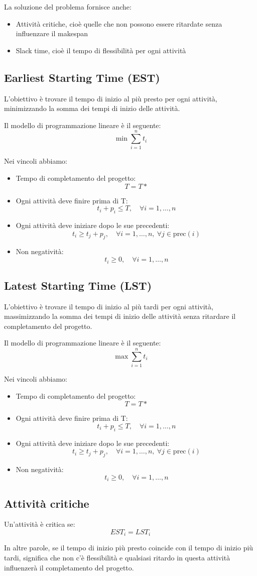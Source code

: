 La soluzione del problema fornisce anche:
\begin{itemize}
    \item Attività critiche, cioè quelle che non possono essere ritardate senza influenzare il makespan
    \item Slack time, cioè il tempo di flessibilità per ogni attività
\end{itemize}

\subsection{Earliest Starting Time (EST)}

L'obiettivo è trovare il tempo di inizio al più presto per ogni attività, 
minimizzando la somma dei tempi di inizio delle attività.

Il modello di programmazione lineare è il seguente:
\[
\min \sum_{i=1}^n t_i
\]

Nei vincoli abbiamo:
\begin{itemize}
    \item Tempo di completamento del progetto:
    \[T = T*\]
    \item Ogni attività deve finire prima di T:
    \[t_i + p_i \leq T, \quad \forall i = 1,\ldots,n\]
    \item Ogni attività deve iniziare dopo le sue precedenti:
    \[t_i \geq t_j + p_j, \quad \forall i = 1,\ldots,n,\ \forall j \in \text{prec}(i)\]
    \item Non negatività:
    \[t_i \geq 0, \quad \forall i = 1,\ldots,n\]
\end{itemize}

\subsection{Latest Starting Time (LST)}
L'obiettivo è trovare il tempo di inizio al più tardi per ogni attività, 
massimizzando la somma dei tempi di inizio delle attività senza ritardare il 
completamento del progetto.

Il modello di programmazione lineare è il seguente:
\[
\max \sum_{i=1}^n t_i
\]

Nei vincoli abbiamo:
\begin{itemize}
    \item Tempo di completamento del progetto:
    \[T = T*\]
    \item Ogni attività deve finire prima di T:
    \[t_i + p_i \leq T, \quad \forall i = 1,\ldots,n\]
    \item Ogni attività deve iniziare dopo le sue precedenti:
    \[t_i \geq t_j + p_j, \quad \forall i = 1,\ldots,n,\ \forall j \in \text{prec}(i)\]
    \item Non negatività:
    \[t_i \geq 0, \quad \forall i = 1,\ldots,n\]
\end{itemize}

\subsection{Attività critiche}
Un'attività è critica se:
\[
EST_i = LST_i
\]

In altre parole, se il tempo di inizio più presto coincide con il tempo di inizio più tardi,
significa che non c'è flessibilità e qualsiasi ritardo in questa attività influenzerà il completamento del progetto.